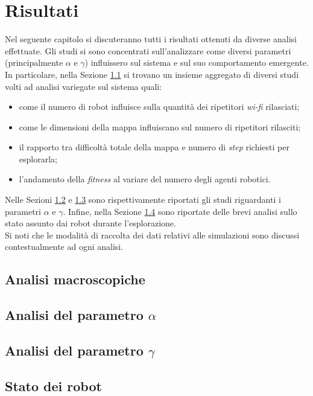 \chapter{Risultati}
\label{chap:results}
Nel seguente capitolo si discuteranno tutti i risultati ottenuti da diverse analisi effettuate.
Gli studi si sono concentrati sull'analizzare come diversi parametri (principalmente $\alpha$ e $\gamma$) influissero sul sistema e sul suo comportamento emergente.
In particolare, nella Sezione \ref{sec:results-macro} si trovano un insieme aggregato di diversi studi volti ad analisi variegate sul sistema quali:\begin{itemize}
	\item come il numero di robot influisce sulla quantità dei ripetitori \textit{wi-fi} rilasciati;
	\item come le dimensioni della mappa influiscano sul numero di ripetitori rilasciti;
	\item il rapporto tra difficoltà totale della mappa e numero di \textit{step} richiesti per esplorarla;
	\item l'andamento della \textit{fitness} al variare del numero degli agenti robotici.
\end{itemize}
Nelle Sezioni \ref{sec:alpha} e \ref{sec:gamma} sono rispettivamente riportati gli studi riguardanti i parametri $\alpha$ e $\gamma$.
Infine, nella Sezione \ref{sec:status} sono riportate delle brevi analisi sullo stato assunto dai robot durante l'esplorazione.\\
Si noti che le modalità di raccolta dei dati relativi alle simulazioni sono discussi contestualmente ad ogni analisi.
\section{Analisi macroscopiche}
\label{sec:results-macro}

\section{Analisi del parametro $\alpha$}
\label{sec:alpha}

\section{Analisi del parametro $\gamma$}
\label{sec:gamma}

\section{Stato dei robot}
\label{sec:status}
